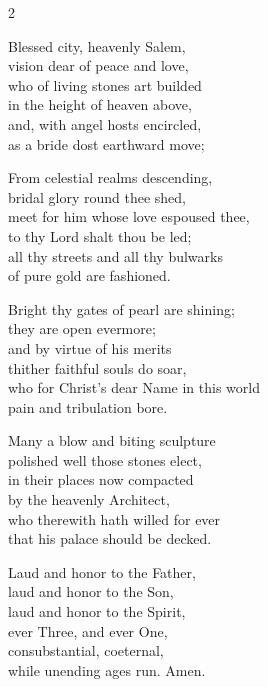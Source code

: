 \begin{multicols}{2}
\begin{enpars}
Blessed city, heavenly Salem,\\
vision dear of peace and love,\\
who of living stones art builded\\
in the height of heaven above,\\
and, with angel hosts encircled,\\
as a bride dost earthward move;

From celestial realms descending,\\
bridal glory round thee shed,\\
meet for him whose love espoused thee,\\
to thy Lord shalt thou be led;\\
all thy streets and all thy bulwarks\\
of pure gold are fashioned.

Bright thy gates of pearl are shining;\\
they are open evermore;\\
and by virtue of his merits\\
thither faithful souls do soar,\\
who for Christ's dear Name in this world\\
pain and tribulation bore.

Many a blow and biting sculpture\\
polished well those stones elect,\\
in their places now compacted\\
by the heavenly Architect,\\
who therewith hath willed for ever\\
that his palace should be decked.

Laud and honor to the Father,\\
laud and honor to the Son,\\
laud and honor to the Spirit,\\
ever Three, and ever One,\\
consubstantial, coeternal,\\
while unending ages run.
Amen.
\end{enpars}
\end{multicols}